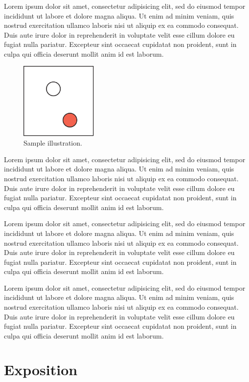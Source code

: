 \documentclass[conference]{acmsiggraph}
\begin{document}
{Lorem ipsum dolor sit amet, consectetur adipisicing elit, sed do
eiusmod tempor incididunt ut labore et dolore magna aliqua. Ut enim ad
minim veniam, quis nostrud exercitation ullamco laboris nisi ut
aliquip ex ea commodo consequat. Duis aute irure dolor in
reprehenderit in voluptate velit esse cillum dolore eu fugiat nulla
pariatur. Excepteur sint occaecat cupidatat non proident, sunt in
culpa qui officia deserunt mollit anim id est laborum.
\begin{figure}[ht]
  \centering
  \includegraphics[width=1.5in]{images/samplefigure}
  \caption{Sample illustration.}
\end{figure}
Lorem ipsum dolor sit amet, consectetur adipisicing elit, sed do
eiusmod tempor incididunt ut labore et dolore magna aliqua. Ut enim ad
minim veniam, quis nostrud exercitation ullamco laboris nisi ut
aliquip ex ea commodo consequat. Duis aute irure dolor in
reprehenderit in voluptate velit esse cillum dolore eu fugiat nulla
pariatur. Excepteur sint occaecat cupidatat non proident, sunt in
culpa qui officia deserunt mollit anim id est laborum.

Lorem ipsum dolor sit amet, consectetur adipisicing elit, sed do
eiusmod tempor incididunt ut labore et dolore magna aliqua. Ut enim ad
minim veniam, quis nostrud exercitation ullamco laboris nisi ut
aliquip ex ea commodo consequat. Duis aute irure dolor in
reprehenderit in voluptate velit esse cillum dolore eu fugiat nulla
pariatur. Excepteur sint occaecat cupidatat non proident, sunt in
culpa qui officia deserunt mollit anim id est laborum.

Lorem ipsum dolor sit amet, consectetur adipisicing elit, sed do
eiusmod tempor incididunt ut labore et dolore magna aliqua. Ut enim ad
minim veniam, quis nostrud exercitation ullamco laboris nisi ut
aliquip ex ea commodo consequat. Duis aute irure dolor in
reprehenderit in voluptate velit esse cillum dolore eu fugiat nulla
pariatur. Excepteur sint occaecat cupidatat non proident, sunt in
culpa qui officia deserunt mollit anim id est laborum.

\section{Exposition}

}
\end{document}
